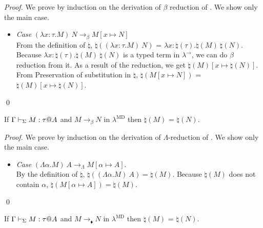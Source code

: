 \begin{proof}
We prove by induction on the derivation of $\beta$ reduction of \LMD.
We show only the main case.
\begin{itemize}
	\newcommand{\R}{\longrightarrow_{\beta}}
	\item \textit{Case} $(\lambda x:\tau.M)\ N \R M[x \mapsto N]$\\
		  From the definition of $\natural$, 
		  $\natural((\lambda x:\tau.M)\ N)$ = $\lambda x:\natural(\tau).\natural(M)\ \natural(N)$.
		  Because $\lambda x:\natural(\tau).\natural(M)\ \natural(N)$ is a typed term in $\lambda^\to$, 
		  we can do $\beta$ reduction from it.
	      As a result of the reduction, we get $\natural(M)[x\mapsto\natural(N)]$.
	      From Preservation of substitution in $\natural$, $\natural(M[x \mapsto N])$ = $\natural(M)[x\mapsto\natural(N)]$.
\end{itemize}
\qed\end{proof}

\begin{lemma}
	If $\G \V M:\tau@A$ and $M \longrightarrow_\beta N$ in $\lambda^{\text{MD}}$
	then $\natural(M)$ =  $\natural(N)$.
\end{lemma}

\begin{proof}
	We prove by induction on the derivation of $\Lambda$-reduction of \LMD.
	We show only the main case.
	\begin{itemize}
		\item \textit{Case} \( (\Lambda\alpha.M)\ A \longrightarrow_\Lambda M[\alpha\mapsto A] \).\\
		By the definition of $\natural$, \(\natural((\Lambda\alpha.M)\ A) = \natural(M)\).
		Because \(\natural(M)\) does not contain \(\alpha\), \(\natural(M[\alpha\mapsto A]) = \natural(M)\).
	\end{itemize}
	\qed
\end{proof}
	
\begin{lemma}
	If $\G \V M:\tau@A$ and $M \longrightarrow_\blacklozenge N$ in $\lambda^{\text{MD}}$
	then $\natural(M)$ =  $\natural(N)$.
\end{lemma}

